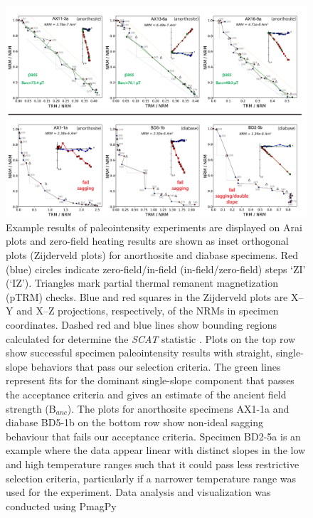\documentclass[9pt,twocolumn,twoside,lineno]{pnas-new}
\begin{document}
\begin{figure}
\noindent\includegraphics[width=17.8cm]{IZZI_examples.pdf}
\centering
\caption{\footnotesize{Example results of paleointensity experiments are displayed on Arai plots and zero-field heating results are shown as inset orthogonal plots (Zijderveld plots) for anorthosite and diabase specimens. Red (blue) circles indicate zero-field/in-field (in-field/zero-field) steps `ZI’ (`IZ’). Triangles mark partial thermal remanent magnetization (pTRM) checks. Blue and red squares in the Zijderveld plots are X–Y and X–Z projections, respectively, of the NRMs in specimen coordinates. Dashed red and blue lines show bounding regions calculated for determine the \textit{SCAT} statistic \cite{Shaar2013a}. Plots on the top row show successful specimen paleointensity results with straight, single-slope behaviors that pass our selection criteria. The green lines represent fits for the dominant single-slope component that passes the acceptance criteria and gives an estimate of the ancient field strength (B$_{anc}$). The plots for anorthosite specimens AX1-1a and diabase BD5-1b on the bottom row show non-ideal sagging behaviour that fails our acceptance criteria. Specimen BD2-5a is an example where the data appear linear with distinct slopes in the low and high temperature ranges such that it could pass less restrictive selection criteria, particularly if a narrower temperature range was used for the experiment. Data analysis and visualization was conducted using PmagPy \cite{Tauxe2016a}}}
\label{fig:IZZI_examples}
\end{figure}
\end{document}
